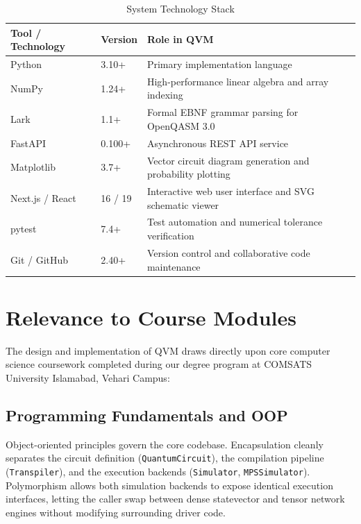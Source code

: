 \begin{table}[h!]
\centering
\caption{System Technology Stack}
\label{tab:tools_tech}
\renewcommand{\arraystretch}{1.3}
\begin{tabularx}{\textwidth}{|p{3.5cm}|p{2.5cm}|X|}
\hline
\textbf{Tool / Technology} & \textbf{Version} & \textbf{Role in QVM} \\
\hline
Python & 3.10+ & Primary implementation language \\
\hline
NumPy & 1.24+ & High-performance linear algebra and array indexing \\
\hline
Lark & 1.1+ & Formal EBNF grammar parsing for OpenQASM 3.0 \\
\hline
FastAPI & 0.100+ & Asynchronous REST API service \\
\hline
Matplotlib & 3.7+ & Vector circuit diagram generation and probability plotting \\
\hline
Next.js / React & 16 / 19 & Interactive web user interface and SVG schematic viewer \\
\hline
pytest & 7.4+ & Test automation and numerical tolerance verification \\
\hline
Git / GitHub & 2.40+ & Version control and collaborative code maintenance \\
\hline
\end{tabularx}
\end{table}


\section{Relevance to Course Modules}

The design and implementation of QVM draws directly upon core computer science coursework completed during our degree program at COMSATS University Islamabad, Vehari Campus:

\subsection{Programming Fundamentals and OOP}
Object-oriented principles govern the core codebase. Encapsulation cleanly separates the circuit definition (\texttt{QuantumCircuit}), the compilation pipeline (\texttt{Transpiler}), and the execution backends (\texttt{Simulator}, \texttt{MPSSimulator}). Polymorphism allows both simulation backends to expose identical execution interfaces, letting the caller swap between dense statevector and tensor network engines without modifying surrounding driver code.

